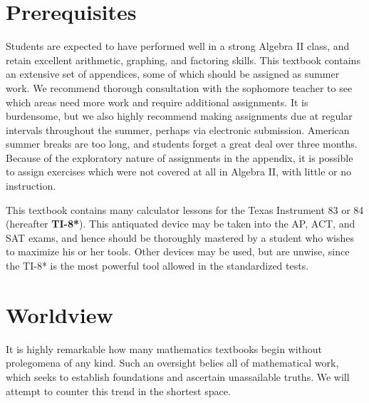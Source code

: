 \section{Prerequisites}
  
Students are expected to have performed well in a strong Algebra II class, and retain excellent
arithmetic, graphing, and factoring skills.  This textbook contains an extensive set of appendices, 
some of which should
be assigned as summer work.  We recommend thorough consultation with the sophomore teacher
to see which areas need more work and require additional assignments.  It is burdensome, but we
also highly recommend making assignments due at regular intervals throughout the summer, perhaps
via electronic submission.
American summer breaks are too long, and students forget a great
deal over three months.  Because of the exploratory nature of assignments in the appendix, it is
possible to assign exercises which were not covered at all in Algebra II, with little or no instruction.


This textbook contains many calculator lessons for the Texas Instrument 83 or 84 (hereafter \textbf{TI-8*}).
This antiquated device may be taken into the AP, ACT, and SAT exams, and hence 
should be thoroughly mastered by a student who wishes to maximize his or her tools.  Other
devices may be used, but are unwise, since the TI-8* is the most powerful tool allowed in the 
standardized tests.



\section{Worldview}
It is highly remarkable how many  mathematics textbooks begin without  
prolegomena of any kind.  Such an oversight belies all of mathematical work, which seeks 
to establish foundations and ascertain unassailable truths.  We will attempt to counter this trend
in the shortest space.


